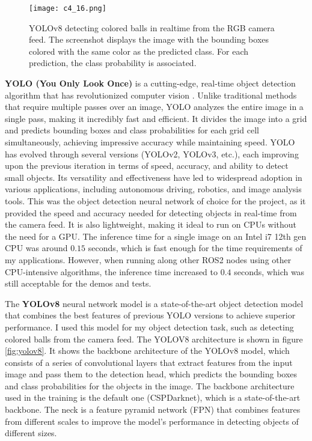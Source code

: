 \begin{figure}[t]
    \centering
    \texttt{[image: c4\_16.png]}
    \caption{YOLOv8 detecting colored balls in realtime from the RGB camera feed. The screenshot displays the image
    with the bounding boxes colored with the same color as the predicted class. For each prediction, the 
    class probability is associated.}
    \label{fig:balls}
\end{figure}

\textbf{YOLO (You Only Look Once)} is a cutting-edge, real-time object detection algorithm 
that has revolutionized computer vision \cite{redmon2015yolo}.
Unlike traditional methods that require multiple passes over an image, YOLO analyzes the entire image in a single pass,
making it incredibly fast and efficient. It divides the image into a grid and predicts bounding boxes and class probabilities
for each grid cell simultaneously, achieving impressive accuracy while maintaining speed. 
YOLO has evolved through several versions (YOLOv2, YOLOv3, etc.), each improving upon the previous iteration in terms of speed, 
accuracy, and ability to detect small objects. Its versatility and effectiveness have led to widespread adoption in various
applications, including autonomous driving, robotics, and image analysis tools. This was the object detection neural
network of choice for the project, as it provided the speed and accuracy needed for detecting objects in real-time
from the camera feed. It is also lightweight, making it ideal to run on CPUs without the need for a GPU.
The inference time for a single image on an Intel i7 12th gen CPU was around $0.15$ seconds, which is fast enough
for the time requirements of my applications. However, when running along other ROS2 nodes using other CPU-intensive
algorithms, the inference time increased to $0.4$ seconds, which was still acceptable for the demos and tests.

The \textbf{YOLOv8} neural network model is a state-of-the-art object detection model \cite{reis2023realtimeyolov8}
that combines the best features of previous YOLO versions
to achieve superior performance. I used this model for my object detection task, such as detecting colored balls
from the camera feed. The YOLOV8 architecture is shown in figure \ref{fig:yolov8}. It shows the backbone architecture
of the YOLOv8 model, which consists of a series of convolutional layers that extract features from the input image
and pass them to the detection head, which predicts the bounding boxes and class probabilities for the objects in the image.
The backbone architecture used in the training is the default one (CSPDarknet), which is a state-of-the-art backbone.
The neck is a feature pyramid network (FPN) that combines features from different scales to improve the model's
performance in detecting objects of different sizes.

